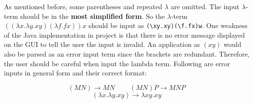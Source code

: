 As mentioned before, some parentheses and repeated $\lambda$ are omitted. The input $\lambda$-term should be in the \textbf{most simplified form}. So the $\lambda$-term $((\lambda x.\lambda y.xy)(\lambda f.fx))x$ should be input as \verb|(\xy.xy)(\f.fx)w|. One weakness of the Java implementation in project is that there is no error message displayed on the GUI to tell the user the input is invalid. An application as $(xy)$ would also be parsed as an error input term since the brackets are redundant. Therefore, the user should be careful when input the lambda term. Following are error inputs in general form and their correct format:

\begin{equation*}
     (MN) \rightarrow MN\ \ \ \ \ \ \ \ \ \ (MN)P\rightarrow MNP
\end{equation*}
\begin{equation*}
     (\lambda x.\lambda y.xy) \rightarrow \lambda xy.xy
\end{equation*}



 


